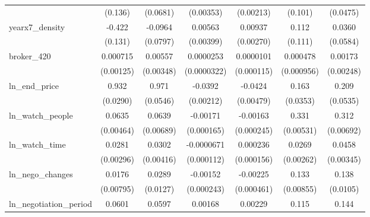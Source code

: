 {\begin{tabular}{l*{6}{c}}
            &     (0.136)         &    (0.0681)         &   (0.00353)         &   (0.00213)         &     (0.101)         &    (0.0475)         \\
\addlinespace
yearx7\_density&      -0.422\sym{***}&     -0.0964         &     0.00563         &     0.00937\sym{***}&       0.112         &      0.0360         \\
            &     (0.131)         &    (0.0797)         &   (0.00399)         &   (0.00270)         &     (0.111)         &    (0.0584)         \\
\addlinespace
broker\_420  &    0.000715         &     0.00557         &   0.0000253         &   0.0000101         &    0.000478         &     0.00173         \\
            &   (0.00125)         &   (0.00348)         & (0.0000322)         &  (0.000115)         &  (0.000956)         &   (0.00248)         \\
\addlinespace
ln\_end\_price&       0.932\sym{***}&       0.971\sym{***}&     -0.0392\sym{***}&     -0.0424\sym{***}&       0.163\sym{***}&       0.209\sym{***}\\
            &    (0.0290)         &    (0.0546)         &   (0.00212)         &   (0.00479)         &    (0.0353)         &    (0.0535)         \\
\addlinespace
ln\_watch\_people&      0.0635\sym{***}&      0.0639\sym{***}&    -0.00171\sym{***}&    -0.00163\sym{***}&       0.331\sym{***}&       0.312\sym{***}\\
            &   (0.00464)         &   (0.00689)         &  (0.000165)         &  (0.000245)         &   (0.00531)         &   (0.00692)         \\
\addlinespace
ln\_watch\_time&      0.0281\sym{***}&      0.0302\sym{***}&  -0.0000671         &    0.000236         &      0.0269\sym{***}&      0.0458\sym{***}\\
            &   (0.00296)         &   (0.00416)         &  (0.000112)         &  (0.000156)         &   (0.00262)         &   (0.00345)         \\
\addlinespace
ln\_nego\_changes&      0.0176\sym{**} &      0.0289\sym{**} &    -0.00152\sym{***}&    -0.00225\sym{***}&       0.133\sym{***}&       0.138\sym{***}\\
            &   (0.00795)         &    (0.0127)         &  (0.000243)         &  (0.000461)         &   (0.00855)         &    (0.0105)         \\
\addlinespace
ln\_negotiation\_period&      0.0601\sym{***}&      0.0597\sym{***}&     0.00168\sym{***}&     0.00229\sym{***}&       0.115\sym{***}&       0.144\sym{***}\\

\end{tabular}}
